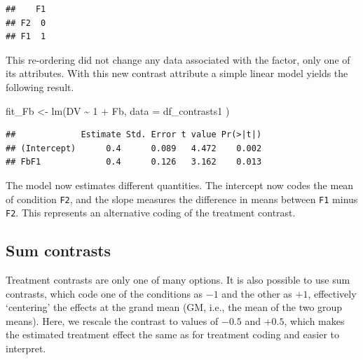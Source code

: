 \documentclass[
  12pt,
]{krantz}
\newenvironment{Shaded}{\begin{snugshade}}{\end{snugshade}}
\newcommand{\AttributeTok}[1]{\textcolor[rgb]{0.77,0.63,0.00}{#1}}
\newcommand{\DecValTok}[1]{\textcolor[rgb]{0.00,0.00,0.81}{#1}}
\newcommand{\FunctionTok}[1]{\textcolor[rgb]{0.00,0.00,0.00}{#1}}
\newcommand{\NormalTok}[1]{#1}
\newcommand{\OtherTok}[1]{\textcolor[rgb]{0.56,0.35,0.01}{#1}}
\newcommand{\SpecialCharTok}[1]{\textcolor[rgb]{0.00,0.00,0.00}{#1}}
\theoremstyle{definition}
\theoremstyle{definition}
\theoremstyle{definition}
\theoremstyle{definition}
\theoremstyle{remark}
\begin{document}
\begin{verbatim}
##    F1
## F2  0
## F1  1
\end{verbatim}

\noindent
This re-ordering did not change any data associated with the factor, only one of its attributes. With this new contrast attribute a simple linear model yields the following result.

\begin{Shaded}
\begin{Highlighting}[]
\NormalTok{fit\_Fb }\OtherTok{\textless{}{-}} \FunctionTok{lm}\NormalTok{(DV }\SpecialCharTok{\textasciitilde{}} \DecValTok{1} \SpecialCharTok{+}\NormalTok{ Fb,}
  \AttributeTok{data =}\NormalTok{ df\_contrasts1}
\NormalTok{)}
\end{Highlighting}
\end{Shaded}

\begin{Shaded}
\end{Shaded}

\begin{verbatim}
##             Estimate Std. Error t value Pr(>|t|)
## (Intercept)      0.4      0.089   4.472    0.002
## FbF1             0.4      0.126   3.162    0.013
\end{verbatim}

The model now estimates different quantities. The intercept now codes the mean of condition \texttt{F2}, and the slope measures the difference in means between \texttt{F1} minus \texttt{F2}. This represents an alternative coding of the treatment contrast.

\hypertarget{effectcoding}{%
\subsection{Sum contrasts}\label{effectcoding}}

Treatment contrasts are only one of many options. It is also possible to use sum contrasts, which code one of the conditions as \(-1\) and the other as \(+1\), effectively `centering' the effects at the grand mean (GM, i.e., the mean of the two group means). Here, we rescale the contrast to values of \(-0.5\) and \(+0.5\), which makes the estimated treatment effect the same as for treatment coding and easier to interpret.
\end{document}
